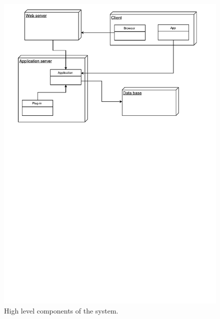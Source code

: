 \begin{figure}[h]
\centering
\includegraphics[width=\textwidth]{diagrams/high_level_components.pdf}
\caption{High level components of the system.}
\label{fig:high_level_components}
\end{figure}
